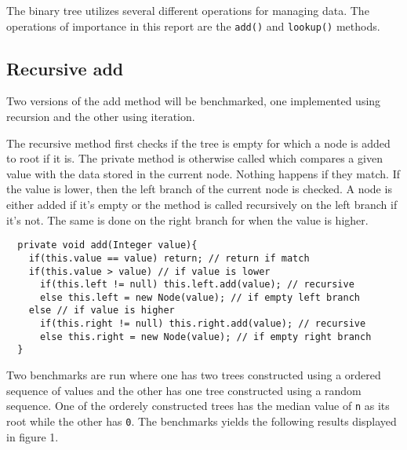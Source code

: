 \documentclass[a4paper,11pt]{article}
\begin{document}
The binary tree utilizes several different operations for managing data. 
The operations of importance in this report are the {\tt add()} and 
{\tt lookup()} methods.

\subsection*{Recursive add}

Two versions of the add method will be benchmarked, one implemented
using recursion and the other using iteration.

The recursive method first checks if the tree is empty for which a node 
is added to root if it is. The private method is otherwise called which 
compares a given value with the data stored in the current node. 
Nothing happens if they match. If the value is lower, then the left 
branch of the current node is checked. A node is either added if it's 
empty or the method is called recursively on the left branch if it's 
not. The same is done on the right branch for when the value is higher.

\begin{verbatim}
  private void add(Integer value){
    if(this.value == value) return; // return if match
    if(this.value > value) // if value is lower
      if(this.left != null) this.left.add(value); // recursive
      else this.left = new Node(value); // if empty left branch
    else // if value is higher
      if(this.right != null) this.right.add(value); // recursive
      else this.right = new Node(value); // if empty right branch
  }
\end{verbatim}

Two benchmarks are run where one has two trees constructed using a
ordered sequence of values and the other has one tree constructed using 
a random sequence. One of the orderely constructed trees has the median 
value of {\tt n} as its root while the other has {\tt 0}. The 
benchmarks yields the following results displayed in figure 1.
\end{document}
